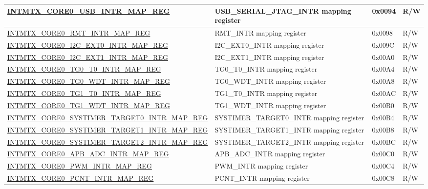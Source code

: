 \begin{longtable}{ | p{10cm} | p{10cm} | p{1.3cm} | p{1cm} | }
\hyperref[regdesc:INTMTXCORE0USBINTRMAPREG]{INTMTX\_CORE0\_USB\_INTR\_MAP\_REG} & USB\_SERIAL\_JTAG\_INTR mapping register & 0x0094 & R/W \\ \hline
\hyperref[regdesc:INTMTXCORE0RMTINTRMAPREG]{INTMTX\_CORE0\_RMT\_INTR\_MAP\_REG} & RMT\_INTR mapping register & 0x0098 & R/W \\ \hline
\hyperref[regdesc:INTMTXCORE0I2CEXT0INTRMAPREG]{INTMTX\_CORE0\_I2C\_EXT0\_INTR\_MAP\_REG} & I2C\_EXT0\_INTR mapping register & 0x009C & R/W \\ \hline
\hyperref[regdesc:INTMTXCORE0I2CEXT1INTRMAPREG]{INTMTX\_CORE0\_I2C\_EXT1\_INTR\_MAP\_REG} & I2C\_EXT1\_INTR mapping register & 0x00A0 & R/W \\ \hline
\hyperref[regdesc:INTMTXCORE0TG0T0INTRMAPREG]{INTMTX\_CORE0\_TG0\_T0\_INTR\_MAP\_REG} & TG0\_T0\_INTR mapping register & 0x00A4 & R/W \\ \hline
\hyperref[regdesc:INTMTXCORE0TG0WDTINTRMAPREG]{INTMTX\_CORE0\_TG0\_WDT\_INTR\_MAP\_REG} & TG0\_WDT\_INTR mapping register & 0x00A8 & R/W \\ \hline
\hyperref[regdesc:INTMTXCORE0TG1T0INTRMAPREG]{INTMTX\_CORE0\_TG1\_T0\_INTR\_MAP\_REG} & TG1\_T0\_INTR mapping register & 0x00AC & R/W \\ \hline
\hyperref[regdesc:INTMTXCORE0TG1WDTINTRMAPREG]{INTMTX\_CORE0\_TG1\_WDT\_INTR\_MAP\_REG} & TG1\_WDT\_INTR mapping register & 0x00B0 & R/W \\ \hline
\hyperref[regdesc:INTMTXCORE0SYSTIMERTARGET0INTRMAPREG]{INTMTX\_CORE0\_SYSTIMER\_TARGET0\_INTR\_MAP\_REG} & SYSTIMER\_TARGET0\_INTR mapping register & 0x00B4 & R/W \\ \hline
\hyperref[regdesc:INTMTXCORE0SYSTIMERTARGET1INTRMAPREG]{INTMTX\_CORE0\_SYSTIMER\_TARGET1\_INTR\_MAP\_REG} & SYSTIMER\_TARGET1\_INTR mapping register & 0x00B8 & R/W \\ \hline
\hyperref[regdesc:INTMTXCORE0SYSTIMERTARGET2INTRMAPREG]{INTMTX\_CORE0\_SYSTIMER\_TARGET2\_INTR\_MAP\_REG} & SYSTIMER\_TARGET2\_INTR mapping register & 0x00BC & R/W \\ \hline
\hyperref[regdesc:INTMTXCORE0APBADCINTRMAPREG]{INTMTX\_CORE0\_APB\_ADC\_INTR\_MAP\_REG} & APB\_ADC\_INTR mapping register & 0x00C0 & R/W \\ \hline
\hyperref[regdesc:INTMTXCORE0PWMINTRMAPREG]{INTMTX\_CORE0\_PWM\_INTR\_MAP\_REG} & PWM\_INTR mapping register & 0x00C4 & R/W \\ \hline
\hyperref[regdesc:INTMTXCORE0PCNTINTRMAPREG]{INTMTX\_CORE0\_PCNT\_INTR\_MAP\_REG} & PCNT\_INTR mapping register & 0x00C8 & R/W \\ \hline

\end{longtable}
